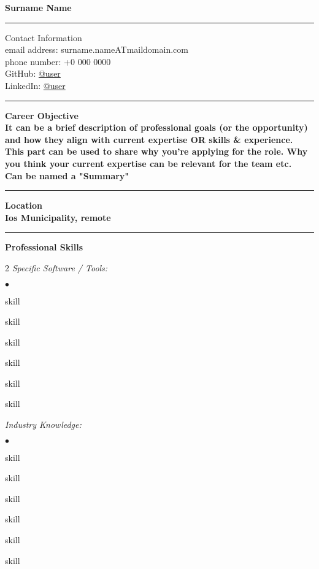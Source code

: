 \documentclass[oneside,final,10pt]{extreport}
\newenvironment{compactlist}{
	\begin{list}{{$\bullet$}}{
		\setlength\leftmargin{0.4cm}
		\setlength\partopsep{0pt}
		\setlength\parskip{0pt}
		\setlength\parsep{0pt}
		\setlength\topsep{0pt}
		\setlength\itemsep{0pt}
	}
}{
	\end{list}
}
\begin{document}
\bfseries
Surname Name \\
\rule{\textwidth}{0.4pt}
Contact Information \\
\noindent
\mdseries
email address: 
surname.nameATmaildomain.com \\
phone number: 
+0 000 0000 \\
GitHub:
\href{https://github.com/user}{@user} \\
LinkedIn:
\href{https://www.linkedin.com/in/username}{@user} \\
\rule{\textwidth}{0.4pt}

\bfseries
Career Objective \\
\mdseries
It can be a brief description of professional goals (or the opportunity) and how they align with current expertise OR skills \& experience. \\
This part can be used to share why you're applying for the role. Why you think your current expertise can be relevant for the team etc. \\
Can be named  a "Summary" \\[5pt]
\rule{\textwidth}{0.4pt}

\bfseries
Location \\
\mdseries
Ios Municipality, remote \\
\rule{\textwidth}{0.4pt}

\bfseries
Professional Skills
\mdseries
\begin{multicols}{2}
\textsl{Specific Software / Tools:}
	 \begin{compactlist}
		 \item skill
		 \item skill
		 \item skill
		 \item skill
		 \item skill
		 \item skill
	 \end{compactlist}
\textsl{Industry Knowledge:}
	 \begin{compactlist}
		 \item skill
		 \item skill
		 \item skill
		 \item skill
		 \item skill
		 \item skill
	 \end{compactlist}
\end{multicols}
\end{document}
